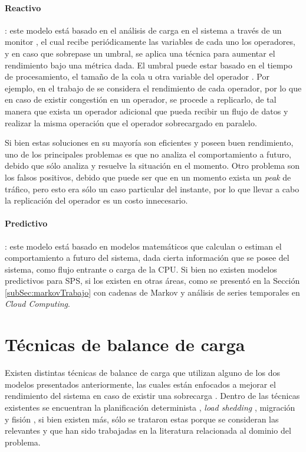 \paragraph{Reactivo}: este modelo está basado en el análisis de carga en el sistema a través de un monitor \citep{GulisanoJPSV12}, el cual recibe periódicamente las variables de cada uno los operadores, y en caso que sobrepase un umbral, se aplica una técnica para aumentar el rendimiento bajo una métrica dada. El umbral puede estar basado en el tiempo de procesamiento, el tamaño de la cola u otra variable del operador \citep{BhuvanagiriGKS06}. Por ejemplo, en el trabajo de \citep{SchneiderAGBW09} se considera el rendimiento de cada operador, por lo que en caso de existir congestión en un operador, se procede a replicarlo, de tal manera que exista un operador adicional que pueda recibir un flujo de datos y realizar la misma operación que el operador sobrecargado en paralelo.

Si bien estas soluciones en su mayoría son eficientes y poseen buen rendimiento, uno de los principales problemas es que no analiza el comportamiento a futuro, debido que sólo analiza y resuelve la situación en el momento. Otro problema son los falsos positivos, debido que puede ser que en un momento exista un \textit{peak} de tráfico, pero esto era sólo un caso particular del instante, por lo que llevar a cabo la replicación del operador es un costo innecesario.

\paragraph{Predictivo}: este modelo está basado en modelos matemáticos que calculan o estiman el comportamiento a futuro del sistema, dada cierta información que se posee del sistema, como flujo entrante o carga de la CPU. Si bien no existen modelos predictivos para SPS, si los existen en otras áreas, como se presentó en la Sección \ref{subSec:markovTrabajo} con cadenas de Markov y análisis de series temporales en \textit{Cloud Computing}.

\section{Técnicas de balance de carga}
\label{sec:tecnicasBC}

Existen distintas técnicas de balance de carga que utilizan alguno de los dos modelos presentados anteriormente, las cuales están enfocados a mejorar el rendimiento del sistema en caso de existir una sobrecarga \citep{HirzelSSGG13}. Dentro de las técnicas existentes se encuentran la planificación determinista \citep{XuCTS14, DongTS07}, \textit{load shedding} \citep{SheuC09}, migración \citep{XingZH05} y fisión \citep{GulisanoJPSV12, IshiiS11, GedikSHW14, FernandezMKP13}, si bien existen más, sólo se trataron estas porque se consideran las relevantes y que han sido trabajadas en la literatura relacionada al dominio del problema.

